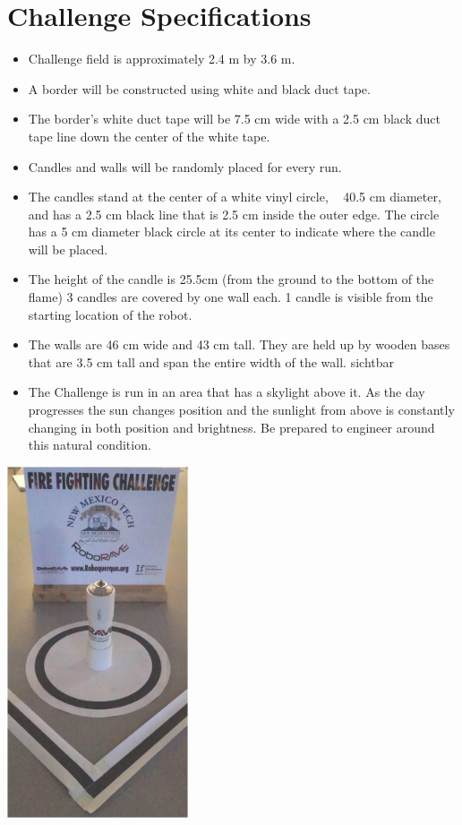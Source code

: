 \documentclass[a4paper,12pt]{article}
\begin{document}
\section{Challenge Specifications}
\begin{itemize}
\item Challenge field is approximately 2.4 m by 3.6 m.
\item A border will be constructed using white and black duct tape.
\item The border’s white duct tape will be 7.5 cm wide with a 2.5 cm black duct tape line
down the center of the white tape.
\item Candles and walls will be randomly placed for every run.
\item The candles stand at the center of a white vinyl circle, ~ 40.5 cm diameter, and has
a 2.5 cm black line that is 2.5 cm inside the outer edge. The circle has a 5 cm
diameter black circle at its center to indicate where the candle will be placed.
\item The height of the candle is 25.5cm (from the ground to the bottom of the flame) 3
candles are covered by one wall each. 1 candle is visible from the starting location
of the robot.
\item The walls are 46 cm wide and 43 cm tall. They are held up by wooden bases that
are 3.5 cm tall and span the entire width of the wall.
sichtbar
\item The Challenge is run in an area that has a skylight above it. As the day progresses the sun changes position
and the sunlight from above is constantly changing in both position and brightness. Be prepared to engineer
around this natural condition.
\end{itemize}
\begin{center}
\includegraphics[width=0.4\textwidth]{candle.jpeg}
\end{center}
\end{document}
